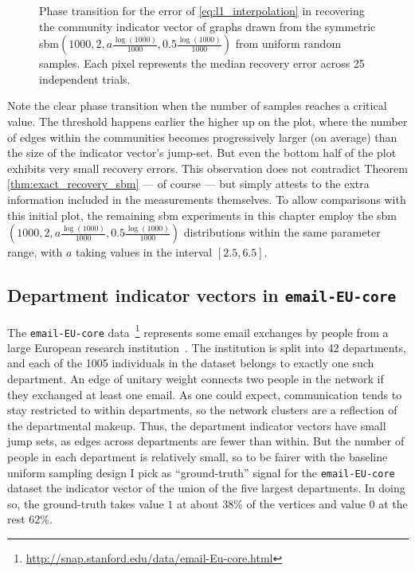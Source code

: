 \begin{figure}[ht]
    \centering
    \hfill
    \caption[Phase transition of the recovery error in 2-\texttt{SSBM}(500~+~500) graphs]{Phase transition for the error of \eqref{eq:l1_interpolation} in recovering the community indicator vector of graphs drawn from the symmetric \acrshort{sbm}$\left(1000, 2, a \frac{\log (1000)}{1000}, 0.5 \frac{\log (1000)}{1000}\right)$ from uniform random samples. Each pixel represents the median recovery error across 25 independent trials.}
    \label{fig:pt_2ssbm_unif_samp_tv_interp_with_thresholds}
\end{figure}

Note the clear phase transition when the number of samples reaches a critical value. The threshold happens earlier the higher up on the plot, where the number of edges within the communities becomes progressively larger (on average) than the size of the indicator vector's jump-set. But even the bottom half of the plot exhibits very small recovery errors. This observation does not contradict Theorem \ref{thm:exact_recovery_sbm} --- of course --- but simply attests to the extra information included in the measurements themselves. To allow comparisons with this initial plot, the remaining \acrshort{sbm} experiments in this chapter employ the \acrshort{sbm}$\left(1000, 2, a \frac{\log (1000)}{1000}, 0.5 \frac{\log (1000)}{1000}\right)$ distributions within the same parameter range, \ie with $a$ taking values in the interval $[2.5, 6.5]$.

\subsection{Department indicator vectors in \texttt{email-EU-core}}

The \texttt{email-EU-core} data~\footnote{\url{http://snap.stanford.edu/data/email-Eu-core.html}} represents some email exchanges by people from a large European research institution~\cite{yin2017}. The institution is split into 42 departments, and each of the 1005 individuals in the dataset belongs to exactly one such department. An edge of unitary weight connects two people in the network if they exchanged at least one email. As one could expect, communication tends to stay restricted to within departments, so the network clusters are a reflection of the departmental makeup. Thus, the department indicator vectors have small jump sets, as edges across departments are fewer than within. But the number of people in each department is relatively small, so to be fairer with the baseline uniform sampling design I pick as ``ground-truth'' signal for the \texttt{email-EU-core} dataset the indicator vector of the union of the five largest departments. In doing so, the ground-truth takes value $1$ at about 38\% of the vertices and value $0$ at the rest 62\%.


